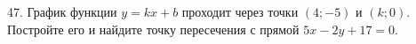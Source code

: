 47. График функции $y=kx+b$ проходит через точки $(4;-5)$ и $(k;0).$ Постройте его и найдите точку пересечения с прямой $5x-2y+17=0.$\\
